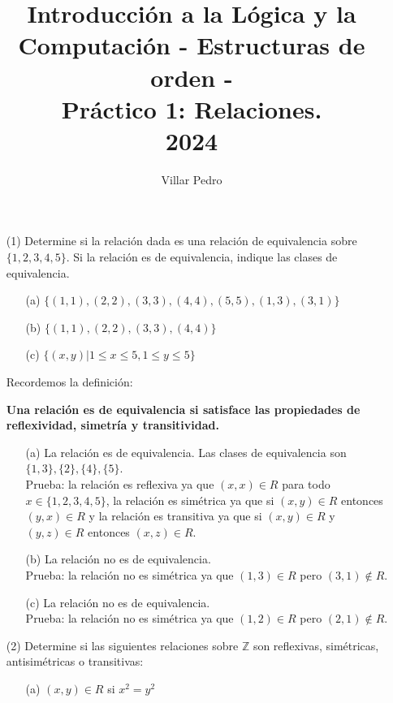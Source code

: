 \documentclass[10pt]{article}
\title{Introducción a la Lógica y la Computación - Estructuras de orden - \\ Práctico 1: Relaciones.
\\
 2024 }
\author{Villar Pedro}
\date{}
\begin{document}
\maketitle
\begin{enumerate}
    \item[(1)] Determine si la relación dada es una relación de equivalencia sobre $\{1, 2, 3, 4, 5\}$. Si la relación es de equivalencia, indique las clases de equivalencia.
    \begin{itemize}
        \item[(a)] $\{(1, 1), (2, 2), (3, 3), (4, 4), (5, 5), (1, 3),(3, 1)\}$
        \item[(b)] $\{(1, 1), (2, 2), (3, 3), (4, 4)\}$
        \item[(c)] $\{(x, y) | 1 \leq x \leq 5, 1 \leq y \leq 5\}$  
    \end{itemize}
    \begin{sol}
        Recordemos la definición: 
        \begin{center}
            \textbf{Una relación es de equivalencia si satisface las propiedades de reflexividad, simetría y transitividad.}    
        \end{center}
        \begin{enumerate}
            \item [(a)] La relación es de equivalencia. Las clases de equivalencia son $\{1, 3\}, \{2\}, \{4\}, \{5\}$. \\
            Prueba: la relación es reflexiva ya que $(x, x) \in R$ para todo $x \in \{1, 2, 3, 4, 5\}$, la relación es simétrica ya que si $(x, y) \in R$ entonces $(y, x) \in R$ y la relación es transitiva ya que si $(x, y) \in R$ y $(y, z) \in R$ entonces $(x, z) \in R$.
            \item [(b)] La relación no es de equivalencia. \\
            Prueba: la relación no es simétrica ya que $(1, 3) \in R$ pero $(3, 1) \notin R$.
            \item [(c)] La relación no es de equivalencia. \\
            Prueba: la relación no es simétrica ya que $(1, 2) \in R$ pero $(2, 1) \notin R$.
        \end{enumerate}
    \end{sol}
    \item[(2)] Determine si las siguientes relaciones sobre $\mathbb{Z}$ son reflexivas, simétricas, antisimétricas o transitivas:
    \begin{itemize}
        \item[(a)] $(x, y) \in R$ si $x^{2}=y^{2}$\\

\end{itemize}
\end{enumerate}
\end{document}
